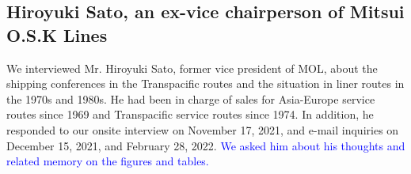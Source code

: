 \documentclass[11pt]{article}
\begin{document}



\subsection{Hiroyuki Sato, an ex-vice chairperson of Mitsui O.S.K Lines}

We interviewed Mr. Hiroyuki Sato, former vice president of MOL, about the shipping conferences in the Transpacific routes and the situation in liner routes in the 1970s and 1980s. He had been in charge of sales for Asia-Europe service routes since 1969 and Transpacific service routes since 1974. In addition, he responded to our onsite interview on November 17, 2021, and e-mail inquiries on December 15, 2021, and February 28, 2022. \textcolor{blue}{We asked him about his thoughts and related memory on the figures and tables.}\\
\end{document}

